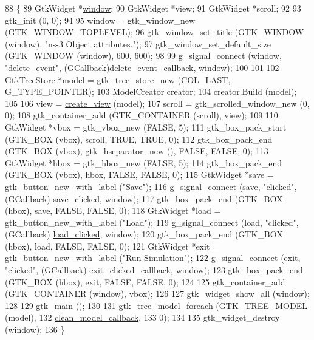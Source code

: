 \begin{DoxyCode}
88 \{
89   GtkWidget *\hyperlink{namespacevisualizer_1_1ipython__view_ae2c349e0d13465bcd100c8bad952117f}{window};
90   GtkWidget *view;
91   GtkWidget *scroll;
92 
93   gtk\_init (0, 0);
94 
95   window = gtk\_window\_new (GTK\_WINDOW\_TOPLEVEL);
96   gtk\_window\_set\_title (GTK\_WINDOW (window), \textcolor{stringliteral}{"ns-3 Object attributes."});
97   gtk\_window\_set\_default\_size (GTK\_WINDOW (window), 600, 600);
98 
99   g\_signal\_connect (window, \textcolor{stringliteral}{"delete\_event"}, (GCallback)\hyperlink{namespacens3_a6b4c03fb0d3d8513e740dd12b7033c2b}{delete\_event\_callback}, window);
100 
101 
102   GtkTreeStore *model = gtk\_tree\_store\_new (\hyperlink{namespacens3_a6e83be9a9c7a487ef6583e1c7b5db333a7d7fad15f1c717d9de73f71dca0f4966}{COL\_LAST}, G\_TYPE\_POINTER);
103   ModelCreator creator;
104   creator.Build (model);
105 
106   view = \hyperlink{namespacens3_ab9bcfcefc473e60e32d1fe4d08431dab}{create\_view} (model);
107   scroll = gtk\_scrolled\_window\_new (0, 0);
108   gtk\_container\_add (GTK\_CONTAINER (scroll), view);
109 
110   GtkWidget *vbox = gtk\_vbox\_new (FALSE, 5);
111   gtk\_box\_pack\_start (GTK\_BOX (vbox), scroll, TRUE, TRUE, 0);
112   gtk\_box\_pack\_end (GTK\_BOX (vbox), gtk\_hseparator\_new (), FALSE, FALSE, 0);
113   GtkWidget *hbox = gtk\_hbox\_new (FALSE, 5);
114   gtk\_box\_pack\_end (GTK\_BOX (vbox), hbox, FALSE, FALSE, 0);
115   GtkWidget *save = gtk\_button\_new\_with\_label (\textcolor{stringliteral}{"Save"});
116   g\_signal\_connect (save, \textcolor{stringliteral}{"clicked"},  (GCallback) \hyperlink{namespacens3_a963273e5e65bfa7288d4645d4f2ec607}{save\_clicked}, window);
117   gtk\_box\_pack\_end (GTK\_BOX (hbox), save, FALSE, FALSE, 0);
118   GtkWidget *load = gtk\_button\_new\_with\_label (\textcolor{stringliteral}{"Load"});
119   g\_signal\_connect (load, \textcolor{stringliteral}{"clicked"},  (GCallback) \hyperlink{namespacens3_af9d871af0ea7b7c0992c485a09016e08}{load\_clicked}, window);
120   gtk\_box\_pack\_end (GTK\_BOX (hbox), load, FALSE, FALSE, 0);
121   GtkWidget *exit = gtk\_button\_new\_with\_label (\textcolor{stringliteral}{"Run Simulation"});
122   g\_signal\_connect (exit, \textcolor{stringliteral}{"clicked"},  (GCallback) \hyperlink{namespacens3_a7f3b1dcf03a7f3a2f0d97a6ccf87fa62}{exit\_clicked\_callback}, window);
123   gtk\_box\_pack\_end (GTK\_BOX (hbox), exit, FALSE, FALSE, 0);
124 
125   gtk\_container\_add (GTK\_CONTAINER (window), vbox);
126 
127   gtk\_widget\_show\_all (window);
128 
129   gtk\_main ();
130 
131   gtk\_tree\_model\_foreach (GTK\_TREE\_MODEL (model), 
132                           \hyperlink{namespacens3_a12e280cbcb12ad1955d5ee0cca1cff47}{clean\_model\_callback},
133                           0);
134 
135   gtk\_widget\_destroy (window);
136 \}
\end{DoxyCode}


